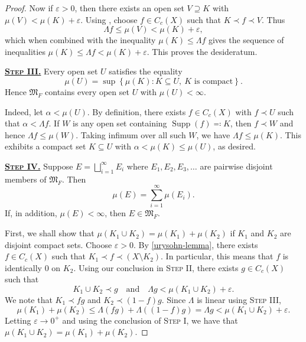 \documentclass[11pt]{article}
\theoremstyle{thmstyle}
\theoremstyle{defstyle}
\newcommand{\frakM}{\mathfrak{M}} %
\newcommand{\Supp}{\operatorname{Supp}}
\renewcommand{\le}{\leqslant}
\begin{document}
\begin{proof}
    Now if $\varepsilon > 0$, then there exists an open set $V\supseteq K$ with $\mu(V) < \mu(K) + \varepsilon$. Using , choose $f\in C_c(X)$ such that $K\prec f\prec V$. Thus 
    \begin{equation*}
        \Lambda f\le \mu(V) < \mu(K) + \varepsilon,
    \end{equation*}
    which when combined with the inequality $\mu(K)\le\Lambda f$ gives the sequence of inequalities $\mu(K)\le\Lambda f < \mu(K) + \varepsilon$. This proves the desideratum.

    \vspace{0.5cm}

    \noindent\underline{\textbf{\textsc{Step III.}}} Every open set $U$ satisfies the equality 
    \begin{equation*}
        \mu(U) = \sup\left\{\mu(K)\colon K\subseteq U,~K\text{ is compact}\right\}.
    \end{equation*}
    Hence $\frakM_F$ contains every open set $U$ with $\mu(U) < \infty$. 


    Indeed, let $\alpha < \mu(U)$. By definition, there exists $f\in C_c(X)$ with $f\prec U$ such that $\alpha < \Lambda f$. If $W$ is any open set containing $\Supp(f)\eqcolon K$, then $f\prec W$ and hence $\Lambda f\le\mu(W)$. Taking infimum over all such $W$, we have $\Lambda f\le\mu(K)$. This exhibits a compact set $K\subseteq U$ with $\alpha < \mu(K)\le\mu(U)$, as desired.

    \vspace{0.5cm}

    \noindent\underline{\textbf{\textsc{Step IV.}}} Suppose $E = \bigsqcup_{i = 1}^\infty E_i$ where $E_1, E_2, E_3,\dots$ are pairwise disjoint members of $\frakM_F$. Then 
    \begin{equation*}
        \mu(E) = \sum_{i = 1}^\infty\mu(E_i).
    \end{equation*}
    If, in addition, $\mu(E) < \infty$, then $E\in\frakM_F$.

    First, we shall show that $\mu(K_1\cup K_2) = \mu(K_1) + \mu(K_2)$ if $K_1$ and $K_2$ are disjoint compact sets. Choose $\varepsilon > 0$. By \ref{urysohn-lemma}, there exists $f\in C_c(X)$ such that $K_1\prec f\prec(X\setminus K_2)$. In particular, this means that $f$ is identically $0$ on $K_2$. Using our conclusion in \textsc{Step II}, there exists $g\in C_c(X)$ such that
    \begin{equation*}
        K_1\cup K_2\prec g\quad\text{and}\quad\Lambda g < \mu(K_1\cup K_2) + \varepsilon.
    \end{equation*}
    We note that $K_1\prec fg$ and $K_2\prec (1 - f)g$. Since $\Lambda$ is linear using \textsc{Step III}, 
    \begin{equation*}
        \mu(K_1) + \mu(K_2)\le\Lambda(fg) + \Lambda((1 - f)g) = \Lambda g < \mu(K_1\cup K_2) + \varepsilon.
    \end{equation*}
    Letting $\varepsilon\to 0^+$ and using the conclusion of \textsc{Step I}, we have that $\mu(K_1\cup K_2) = \mu(K_1) + \mu(K_2)$. 


\end{proof}
\end{document}
